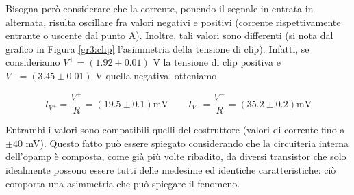 Bisogna però considerare che la corrente, ponendo il segnale in entrata in alternata, risulta oscillare fra valori negativi e positivi (corrente rispettivamente entrante o uscente dal punto A). Inoltre, tali valori sono differenti (si nota dal grafico in Figura \ref{gr3:clip} l'asimmetria della tensione di clip). Infatti, se consideriamo $V^+ = (1.92 \pm 0.01)$ \si{\volt} la tensione di clip positiva e $V^- = (3.45 \pm 0.01)$ \si{\volt} quella negativa, otteniamo

$$I_{V^+} = \frac{V^+}{R} = (19.5 \pm 0.1) \si{\milli\volt}  \qquad I_{V^-} = \frac{V^-}{R} = (35.2 \pm 0.2) \si{\milli\volt}$$

Entrambi i valori sono compatibili quelli del costruttore (valori di corrente fino a $\pm 40$ \si{\milli\volt}). Questo fatto può essere spiegato considerando che la circuiteria interna dell'opamp è composta, come già più volte ribadito, da diversi transistor che solo idealmente possono essere tutti delle medesime ed identiche caratteristiche: ciò comporta una asimmetria che può spiegare il fenomeno.
